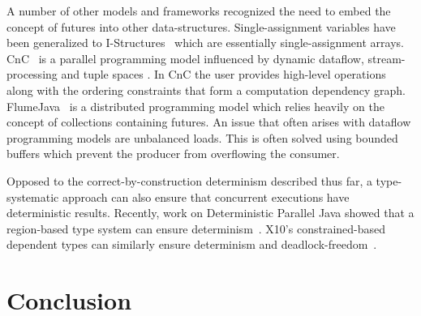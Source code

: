 A number of other models and frameworks recognized the need to embed
the concept of futures into other data-structures.
Single-assignment variables have been generalized to I-Structures~\cite{Arvind89} which are essentially
single-assignment arrays.
CnC~\cite{Burke11,CnC10} is a parallel programming model
influenced by dynamic dataflow, stream-processing and tuple spaces \cite{Gelernter85}.
In CnC the user provides high-level operations along with the ordering
constraints that form a computation dependency graph.
FlumeJava~\cite{Chambers10} is a distributed programming model which
relies heavily on the concept of collections containing futures.
An issue that often arises with dataflow programming models are
unbalanced loads.
This is often solved using bounded buffers which prevent
the producer from overflowing the consumer.

Opposed to the correct-by-construction determinism described thus far,
a type-systematic approach can also ensure that concurrent executions
have deterministic results.
Recently, work on Deterministic Parallel Java showed that a
region-based type system can ensure determinism~\cite{Bocchino09}.
X10's constrained-based dependent types can similarly ensure
determinism and deadlock-freedom~\cite{Saraswat07}.


\section{Conclusion}




